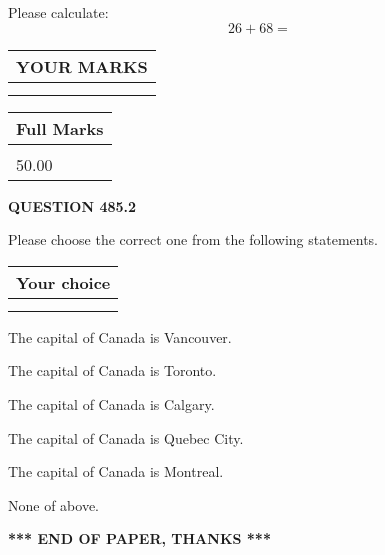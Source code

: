 \documentclass[12pt]{article}
\begin{document}
  
 
Please calculate:
\begin{equation}
26 +  %
68 = \nonumber
\end{equation}
 

 

 
  
\vspace{0.2in}
  
\noindent\begin{tabular}{|l|}
\hline
 YOUR MARKS  \\
\hline
 \\ 
 \\ 
\hline
\end{tabular}
\hspace{0.05in} \begin{tabular}{|l|}
\hline
 Full Marks  \\
\hline
 \\ 
50.00 \\
\hline
\end{tabular}
{\textbf{\Large{QUESTION
485.2 
}}}
  
  
Please choose the correct one from the following statements.
  
  
\noindent\hspace{3.0in} \begin{tabular}{|l|}
\hline
Your choice \\
\hline
 \\ 
 \\ 
\hline
\end{tabular}
  
  
 
 
The capital of Canada is Vancouver.
 
 
The capital of Canada is Toronto.
 
 
The capital of Canada is Calgary.
 
 
The capital of Canada is Quebec City.
 
 
The capital of Canada is Montreal.
 
 
 None of above.
 
 
   
   
 \vspace{0.2in}
 
   
   
   
   
\vspace{1.0in} 
{\textbf{\large{ *** END OF PAPER, THANKS *** }}} 
   
\end{document}

